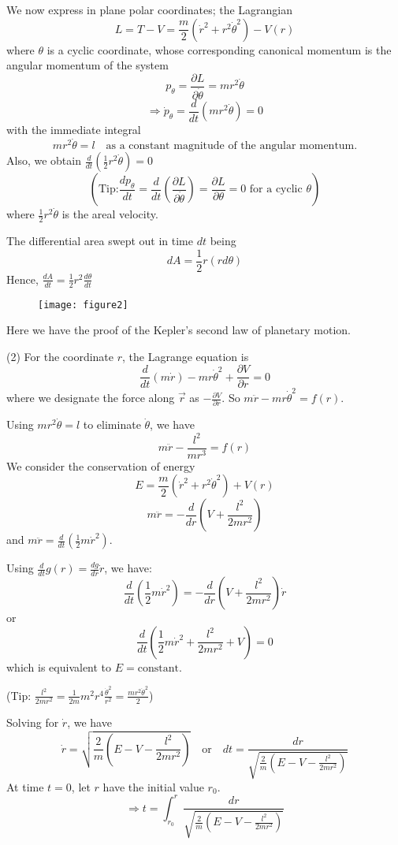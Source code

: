 \documentclass{article}
\begin{document}
	We now express in plane polar coordinates; the Lagrangian
	$$ L = T - V = \frac{m}{2}(\dot{r}^2 + r^2\dot{\theta}^2) - V(r) $$
	where $\theta$ is a cyclic coordinate, whose corresponding canonical momentum is the angular momentum of the system
	$$ p_{\theta} = \frac{\partial L}{\partial \dot{\theta}} = mr^2\dot{\theta} $$
	$$ \Rightarrow \dot{p}_{\theta} = \frac{d}{dt}(mr^2\dot{\theta}) = 0 $$
	with the immediate integral
	$$ mr^2\dot{\theta} = l \quad \text{as a constant magnitude of the angular momentum.} $$
	Also, we obtain $\frac{d}{dt}(\frac{1}{2}r^2\dot{\theta})=0$
	$$ ( \text{Tip:} \frac{dp_{\theta}}{dt} = \frac{d}{dt}\left(\frac{\partial L}{\partial \dot{\theta}}\right) = \frac{\partial L}{\partial \theta} = 0 \text{ for a cyclic } \theta ) $$
	where $\frac{1}{2}r^2\dot{\theta}$ is the areal velocity.
	
	The differential area swept out in time $dt$ being
	$$ dA = \frac{1}{2}r(rd\theta) $$
	Hence, $\frac{dA}{dt} = \frac{1}{2}r^2\frac{d\theta}{dt}$
	
  \begin{figure}[h]
	\centering
	\texttt{[image: figure2]}
	\caption{}
	\label{fig:figure2}
    \end{figure}

	Here we have the proof of the Kepler's second law of planetary motion.
	
	(2) For the coordinate $r$, the Lagrange equation is
	$$ \frac{d}{dt}(m\dot{r}) - mr\dot{\theta}^2 + \frac{\partial V}{\partial r} = 0 $$
	where we designate the force along $\vec{r}$ as $-\frac{\partial V}{\partial r}$.
	So $m\ddot{r} - mr\dot{\theta}^2 = f(r)$.
	
	Using $mr^2\dot{\theta}=l$ to eliminate $\dot{\theta}$, we have
	$$ m\ddot{r} - \frac{l^2}{mr^3} = f(r) $$
	We consider the conservation of energy
	$$ E = \frac{m}{2}(\dot{r}^2 + r^2\dot{\theta}^2) + V(r) $$
	$$ m\ddot{r} = -\frac{d}{dr}\left(V + \frac{l^2}{2mr^2}\right) $$
	and $m\ddot{r} = \frac{d}{dt}(\frac{1}{2}m\dot{r}^2)$.
	
	Using $\frac{d}{dt}g(r) = \frac{dg}{dr}\dot{r}$, we have:
	$$ \frac{d}{dt}(\frac{1}{2}m\dot{r}^2) = -\frac{d}{dr}\left(V + \frac{l^2}{2mr^2}\right)\dot{r} $$
	or
	$$ \frac{d}{dt}\left(\frac{1}{2}m\dot{r}^2 + \frac{l^2}{2mr^2} + V\right) = 0 $$
	which is equivalent to $E = \text{constant}$.
	
	(Tip: $\frac{l^2}{2mr^2} = \frac{1}{2m}m^2r^4\frac{\dot{\theta}^2}{r^2} = \frac{mr^2\dot{\theta}^2}{2}$)
	
	Solving for $\dot{r}$, we have
	$$ \dot{r} = \sqrt{\frac{2}{m}\left(E - V - \frac{l^2}{2mr^2}\right)} \quad \text{or} \quad dt = \frac{dr}{\sqrt{\frac{2}{m}\left(E - V - \frac{l^2}{2mr^2}\right)}} $$
	At time $t=0$, let $r$ have the initial value $r_0$.
	$$ \Rightarrow t = \int_{r_0}^{r} \frac{dr}{\sqrt{\frac{2}{m}\left(E - V - \frac{l^2}{2mr^2}\right)}} $$
	
\end{document}
